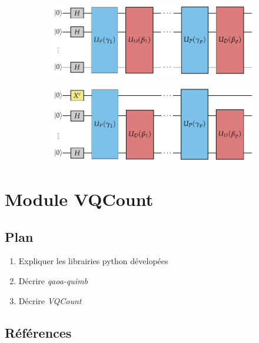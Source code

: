 \begin{figure}[t]
    \centering
    \begin{subfigure}[h]{0.45\textwidth}
    \centering
    \includegraphics[width=1\textwidth]{figures/qaoa-self-reducibility-1.pdf}
    \caption{}
    \label{fig:quantum-circuit-a}
    \end{subfigure}
    \begin{subfigure}[h]{0.45\textwidth}
    \centering
    \includegraphics[width=1\textwidth]{figures/qaoa-self-reducibility-2.pdf}
    \caption{}
    \label{fig:quantum-circuit-b}
    \end{subfigure}
\caption{}
\label{fig:quantum-circuit}
\end{figure}



\section{Module VQCount}

\subsection*{Plan}

\begin{enumerate}
    \item Expliquer les librairies python dévelopées
    \item Décrire \textit{qaoa-quimb}
    \item Décrire \textit{VQCount}
\end{enumerate}

\subsection*{Références}